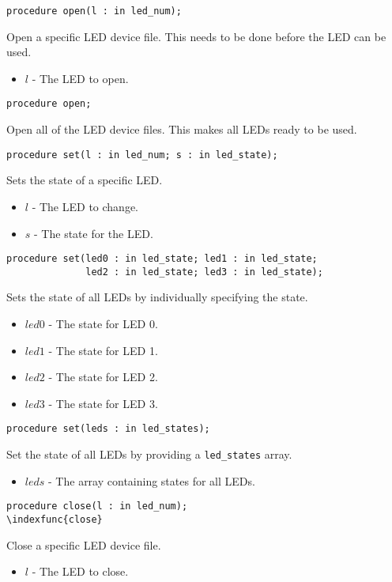 \documentclass[10pt, openany]{book}
\newcommand{\indexfunc}[1]{\index[func]{#1}}
\newcommand{\datatype}[1]{\texttt{#1}}
\begin{document}
\begin{lstlisting}
procedure open(l : in led_num);
\end{lstlisting}
\indexfunc{open}
Open a specific LED device file.  This needs to be done before the LED can be used.
\begin{itemize}
  \item $l$ - The LED to open.
\end{itemize}

\begin{lstlisting}
procedure open;
\end{lstlisting}
\indexfunc{open}
Open all of the LED device files.  This makes all LEDs ready to be used.

\begin{lstlisting}
procedure set(l : in led_num; s : in led_state);
\end{lstlisting}
\indexfunc{set}
Sets the state of a specific LED.
\begin{itemize}
  \item $l$ - The LED to change.
  \item $s$ - The state for the LED.
\end{itemize}

\begin{lstlisting}
procedure set(led0 : in led_state; led1 : in led_state;
              led2 : in led_state; led3 : in led_state);
\end{lstlisting}
\indexfunc{set}
Sets the state of all LEDs by individually specifying the state.
\begin{itemize}
  \item $led0$ - The state for LED 0.
  \item $led1$ - The state for LED 1.
  \item $led2$ - The state for LED 2.
  \item $led3$ - The state for LED 3.
\end{itemize}

\begin{lstlisting}
procedure set(leds : in led_states);
\end{lstlisting}
\indexfunc{set}
Set the state of all LEDs by providing a \datatype{led\_states} array.
\begin{itemize}
  \item $leds$ - The array containing states for all LEDs.
\end{itemize}

\begin{lstlisting}
procedure close(l : in led_num);
\indexfunc{close}
\end{lstlisting}
Close a specific LED device file.
\begin{itemize}
  \item $l$ - The LED to close.
\end{itemize}
\end{document}

